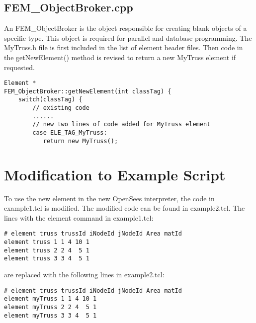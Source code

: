 \documentclass[12pt]{article}
\begin{document}
\subsection {FEM\_ObjectBroker.cpp}
An FEM\_ObjectBroker is the object responsible for creating blank
objects of a specific type. This object is required for parallel and
database programming. The MyTruss.h file is first included in the list of
element header files. Then code in the {\sf getNewElement()} method
is revised to return a new MyTruss element if requested.

{\sf \begin{verbatim}
Element *
FEM_ObjectBroker::getNewElement(int classTag) {
    switch(classTag) {
        // existing code
        ......
        // new two lines of code added for MyTruss element
        case ELE_TAG_MyTruss:  
           return new MyTruss();

\end{verbatim}}


\section{Modification to Example Script}
To use the new element in the new OpenSees interpreter, the code in
example1.tcl is modified. The modified code can be found in
example2.tcl. The lines with the element command in example1.tcl:

{\sf\small \begin{verbatim}
# element truss trussId iNodeId jNodeId Area matId
element truss 1 1 4 10 1
element truss 2 2 4  5 1
element truss 3 3 4  5 1
\end{verbatim}}

are replaced with the following lines in example2.tcl:

{\sf\small \begin{verbatim}
# element truss trussId iNodeId jNodeId Area matId
element myTruss 1 1 4 10 1
element myTruss 2 2 4  5 1
element myTruss 3 3 4  5 1
\end{verbatim}}
\end{document}
